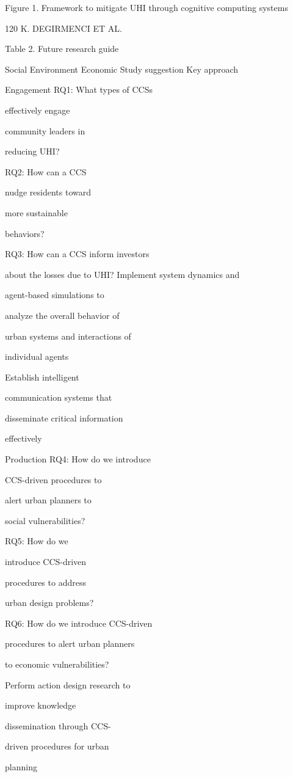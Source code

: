 \documentclass[10pt,a4paper]{article}
\begin{document}
Figure 1. Framework to mitigate UHI through cognitive computing systems

120 K. DEGIRMENCI ET AL.

Table 2. Future research guide

Social Environment Economic Study suggestion Key approach

Engagement RQ1: What types of CCSs

eﬀectively engage

community leaders in

reducing UHI?

RQ2: How can a CCS

nudge residents toward

more sustainable

behaviors?

RQ3: How can a CCS inform investors

about the losses due to UHI? Implement system dynamics and

agent-based simulations to

analyze the overall behavior of

urban systems and interactions of

individual agents

Establish intelligent

communication systems that

disseminate critical information

eﬀectively

Production RQ4: How do we introduce

CCS-driven procedures to

alert urban planners to

social vulnerabilities?

RQ5: How do we

introduce CCS-driven

procedures to address

urban design problems?

RQ6: How do we introduce CCS-driven

procedures to alert urban planners

to economic vulnerabilities?

Perform action design research to

improve knowledge

dissemination through CCS-

driven procedures for urban

planning
\end{document}
